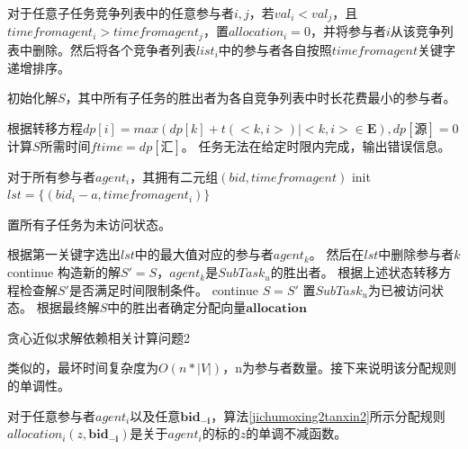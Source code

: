 \documentclass[promaster]{thesis-uestc}
\begin{document}
\begin{algorithm}[p]
    对于任意子任务竞争列表中的任意参与者$i,j$，若$val_i < val_j$，且$timefromagent_i > timefromagent_j$，置$allocation_i = 0$，并将参与者$i$从该竞争列表中删除。然后将各个竞争者列表$list_i$中的参与者各自按照$timefromagent$关键字递增排序。\;

    初始化解$S$，其中所有子任务的胜出者为各自竞争列表中时长花费最小的参与者。\;
    
    根据转移方程$dp[i] = max(dp[k]+t(<k,i>)|<k,i> \in \mathbf{E}),dp[\text{源}] = 0$计算$S$所需时间$ftime = dp[\text{汇}]$。\;
    {
        任务无法在给定时限内完成，输出错误信息。\;
    }

    对于所有参与者$agent_i$，其拥有二元组$(bid,timefromagent)$\;
    init $lst =\{(bid_i-a,timefromagent_i)\}$\;

    置所有子任务为未访问状态。\;

    {
        根据第一关键字选出$lst$中的最大值对应的参与者$agent_k$。\;
        然后在$lst$中删除参与者$k$\;
        {
            continue\;
        }
        构造新的解$S' = S$，$agent_k$是$SubTask_u$的胜出者。\;
        根据上述状态转移方程检查解$S'$是否满足时间限制条件。\;
        {
            continue\;
        }
        $S=S'$\;
        置$SubTask_u$为已被访问状态。\;
    }
    根据最终解$S$中的胜出者确定分配向量$\mathbf{allocation}$\;
\caption{贪心近似求解依赖相关计算问题2}
\label{jichumoxing2tanxin2}
\end{algorithm}

类似的，最坏时间复杂度为$O(n*|V|)$，n为参与者数量。接下来说明该分配规则的单调性。

\begin{theorem}
对于任意参与者$agent_i$以及任意$\mathbf{bid_{-i}}$，算法\ref{jichumoxing2tanxin2}所示分配规则$allocation_i(z,\mathbf{bid_{-i}})$是关于$agent_i$的标的$z$的单调不减函数。
\end{theorem}
\end{document}

